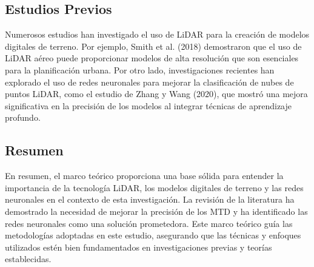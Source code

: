 \subsection{Estudios Previos}
Numerosos estudios han investigado el uso de LiDAR para la creación de modelos digitales de terreno. Por ejemplo, Smith et al. (2018) demostraron que el uso de LiDAR aéreo puede proporcionar modelos de alta resolución que son esenciales para la planificación urbana. Por otro lado, investigaciones recientes han explorado el uso de redes neuronales para mejorar la clasificación de nubes de puntos LiDAR, como el estudio de Zhang y Wang (2020), que mostró una mejora significativa en la precisión de los modelos al integrar técnicas de aprendizaje profundo.
\espacio

\subsection{Resumen}
En resumen, el marco teórico proporciona una base sólida para entender la importancia de la tecnología LiDAR, los modelos digitales de terreno y las redes neuronales en el contexto de esta investigación. La revisión de la literatura ha demostrado la necesidad de mejorar la precisión de los MTD y ha identificado las redes neuronales como una solución prometedora. Este marco teórico guía las metodologías adoptadas en este estudio, asegurando que las técnicas y enfoques utilizados estén bien fundamentados en investigaciones previas y teorías establecidas.